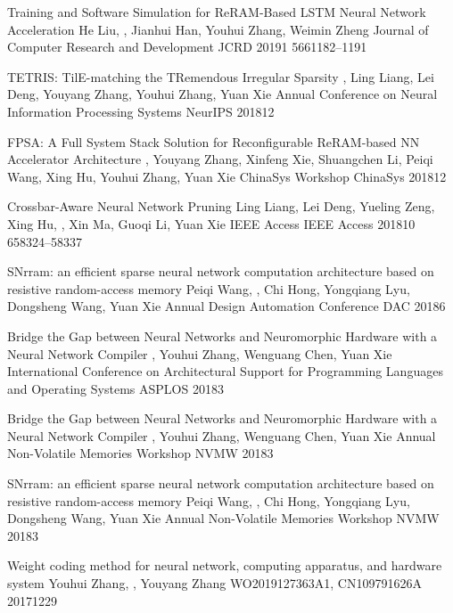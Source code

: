{Training and Software Simulation for ReRAM-Based LSTM Neural Network Acceleration}
{He Liu, , Jianhui Han, Youhui Zhang, Weimin Zheng}
{Journal of Computer Research and Development}
{JCRD}
{2019}{1}
{56}{6}{1182--1191}

{TETRIS: TilE-matching the TRemendous Irregular Sparsity}
{, Ling Liang, Lei Deng, Youyang Zhang, Youhui Zhang, Yuan Xie}
{Annual Conference on Neural Information Processing Systems}
{NeurIPS}
{2018}{12}

{FPSA: A Full System Stack Solution for Reconfigurable ReRAM-based NN Accelerator Architecture}
{, Youyang Zhang, Xinfeng Xie, Shuangchen Li, Peiqi Wang, Xing Hu, Youhui Zhang, Yuan Xie}
{ChinaSys Workshop}
{ChinaSys}
{2018}{12}

{Crossbar-Aware Neural Network Pruning}
{Ling Liang, Lei Deng, Yueling Zeng, Xing Hu, , Xin Ma, Guoqi Li, Yuan Xie}
{IEEE Access}
{IEEE Access}
{2018}{10}
{6}{}{58324--58337}

{SNrram: an efficient sparse neural network computation architecture based on resistive random-access memory}
{Peiqi Wang, , Chi Hong, Yongqiang Lyu, Dongsheng Wang, Yuan Xie}
{Annual Design Automation Conference}
{DAC}
{2018}{6}

{Bridge the Gap between Neural Networks and Neuromorphic Hardware with a Neural Network Compiler}
{, Youhui Zhang, Wenguang Chen, Yuan Xie}
{International Conference on Architectural Support for Programming Languages and Operating Systems}
{ASPLOS}
{2018}{3}

{Bridge the Gap between Neural Networks and Neuromorphic Hardware with a Neural Network Compiler}
{, Youhui Zhang, Wenguang Chen, Yuan Xie}
{Annual Non-Volatile Memories Workshop}
{NVMW}
{2018}{3}

{SNrram: an efficient sparse neural network computation architecture based on resistive random-access memory}
{Peiqi Wang, , Chi Hong, Yongqiang Lyu, Dongsheng Wang, Yuan Xie}
{Annual Non-Volatile Memories Workshop}
{NVMW}
{2018}{3}

{Weight coding method for neural network, computing apparatus, and hardware system}
{Youhui Zhang, , Youyang Zhang}
{WO2019127363A1, CN109791626A}
{2017}{12}{29}


